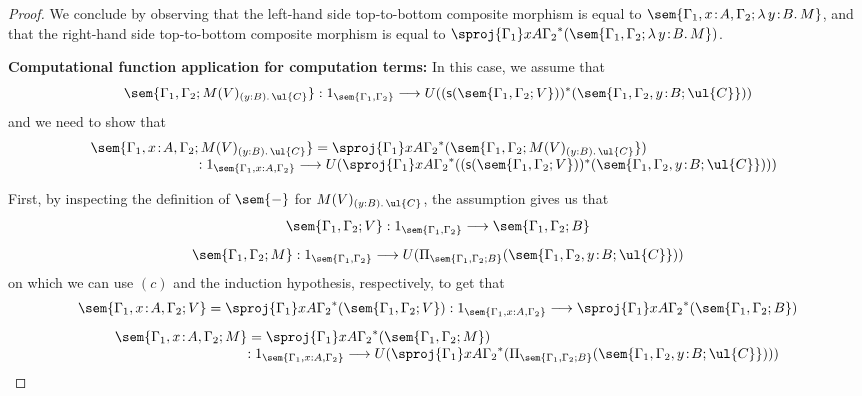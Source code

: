 \begin{proof}
\pagebreak
We conclude by observing that the left-hand side top-to-bottom composite morphism is equal to $\sem{\Gamma_1, x \!:\! A,\Gamma_2; \lambda \, y \!:\! B .\, M}$, and that the right-hand side top-to-bottom composite morphism
is equal to $\sproj {\Gamma_1} x A {\Gamma_2}^*(\sem{\Gamma_1,\Gamma_2;\lambda \, y \!:\! B .\, M})$. 

\vspace{0.2cm}
\noindent
\textbf{Computational function application for computation terms:}
In this case, we assume that 
\[
\sem{\Gamma_1,\Gamma_2; M(V)_{(y : B).\,\ul{C}}} : 1_{\sem{\Gamma_1,\Gamma_2}} \longrightarrow U((\mathsf{s}(\sem{\Gamma_1,\Gamma_2;V}))^*(\sem{\Gamma_1,\Gamma_2,y \!:\! B;\ul{C}}))
\]
and we need to show that
\[
\begin{array}{c}
\hspace{-3.5cm}
\sem{\Gamma_1, x \!:\! A,\Gamma_2; M(V)_{(y : B).\,\ul{C}}} = 
\sproj {\Gamma_1} x A {\Gamma_2}^*(\sem{\Gamma_1,\Gamma_2; M(V)_{(y : B).\,\ul{C}}}) 
\\
\hspace{2.5cm}
: 1_{\sem{\Gamma_1, x : A,\Gamma_2}} \longrightarrow U(\sproj {\Gamma_1} x A {\Gamma_2}^*((\mathsf{s}(\sem{\Gamma_1,\Gamma_2;V}))^*(\sem{\Gamma_1,\Gamma_2,y \!:\! B;\ul{C}})))
\end{array}
\]

First, by inspecting the definition of $\sem{-}$ for $M(V)_{(y : B).\,\ul{C}}$, the assumption gives us that
\[
\begin{array}{c}
\sem{\Gamma_1,\Gamma_2; V} : 1_{\sem{\Gamma_1,\Gamma_2}} \longrightarrow \sem{\Gamma_1,\Gamma_2;B}
\\[3mm]
\sem{\Gamma_1,\Gamma_2; M} : 1_{\sem{\Gamma_1,\Gamma_2}} \longrightarrow U(\Pi_{\sem{\Gamma_1,\Gamma_2;B}}(\sem{\Gamma_1,\Gamma_2,y \!:\! B;\ul{C}}))
\end{array}
\]
on which we can use $(c)$ and the induction hypothesis, respectively, to get that
\[
\begin{array}{c}
\sem{\Gamma_1, x \!:\! A,\Gamma_2; V} = 
\sproj {\Gamma_1} x A {\Gamma_2}^*(\sem{\Gamma_1,\Gamma_2; V}) 
: 1_{\sem{\Gamma_1, x : A,\Gamma_2}} \longrightarrow \sproj {\Gamma_1} x A {\Gamma_2}^*(\sem{\Gamma_1,\Gamma_2;B})
\\[3mm]
\hspace{-6.8cm}
\sem{\Gamma_1, x \!:\! A,\Gamma_2; M} = 
\sproj {\Gamma_1} x A {\Gamma_2}^*(\sem{\Gamma_1,\Gamma_2; M}) 
\\
\hspace{3.8cm}
: 1_{\sem{\Gamma_1, x : A,\Gamma_2}} \longrightarrow U(\sproj {\Gamma_1} x A {\Gamma_2}^*(\Pi_{\sem{\Gamma_1,\Gamma_2;B}}(\sem{\Gamma_1,\Gamma_2,y \!:\! B;\ul{C}})))
\end{array}
\]


\end{proof}
